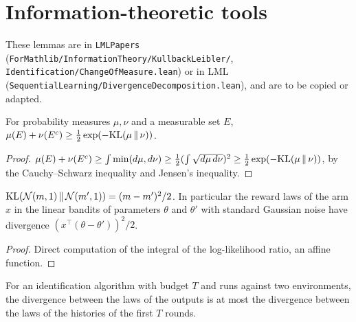 \chapter{Information-theoretic tools}
\label{chap:prereq_information}

These lemmas are in \texttt{LMLPapers} (\texttt{ForMathlib/InformationTheory/KullbackLeibler/},
\texttt{Identification/ChangeOfMeasure.lean}) or in LML
(\texttt{SequentialLearning/DivergenceDecomposition.lean}), and are to be copied or adapted.

\begin{lemma}
  \label{lem:bretagnolle_huber}
  \leanok
  For probability measures $\mu, \nu$ and a measurable set $E$,
  $\mu(E) + \nu(E^c) \ge \frac12 \exp(-\mathrm{KL}(\mu \,\|\, \nu))$.
\end{lemma}

\begin{proof}
  \leanok
  $\mu(E) + \nu(E^c) \ge \int \min(d\mu, d\nu) \ge \frac12 (\int \sqrt{d\mu\, d\nu})^2 \ge \frac12
  \exp(-\mathrm{KL}(\mu \,\|\, \nu))$, by the Cauchy--Schwarz inequality and Jensen's inequality.
\end{proof}

\begin{lemma}
  \label{lem:kl_gaussian}
  \leanok
  $\mathrm{KL}(\mathcal{N}(m, 1) \,\|\, \mathcal{N}(m', 1)) = (m - m')^2 / 2$. In particular the reward laws of the
  arm $x$ in the linear bandits of parameters $\theta$ and $\theta'$ with standard Gaussian noise
  have divergence $(x^\top(\theta - \theta'))^2 / 2$.
\end{lemma}

\begin{proof}
  \leanok
  Direct computation of the integral of the log-likelihood ratio, an affine function.
\end{proof}

\begin{lemma}
  \label{lem:data_processing_output}
  \leanok
  For an identification algorithm with budget $T$ and runs against two environments, the divergence
  between the laws of the outputs is at most the divergence between the laws of the histories of
  the first $T$ rounds.
\end{lemma}


